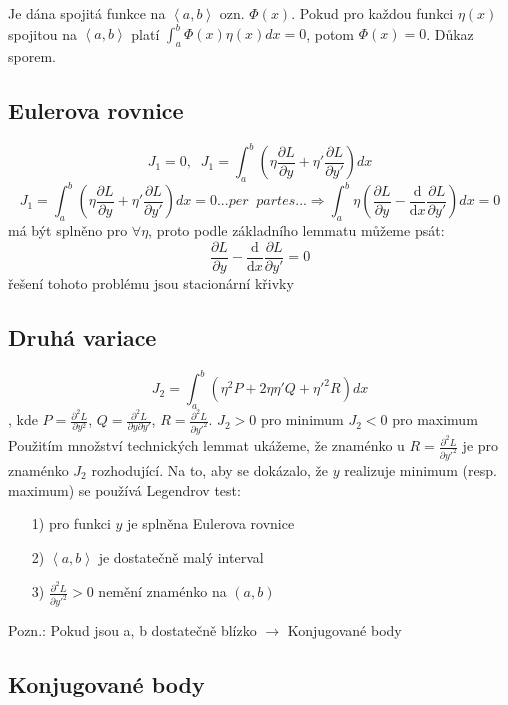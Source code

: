 {Je dána spojitá funkce na $\left \langle a,b \right \rangle$ ozn. $\Phi (x)$. Pokud pro každou funkci $\eta (x)$ spojitou na $\left \langle a,b \right \rangle$ platí $\int_{a}^{b}\Phi (x)\eta (x)dx=0$, potom $\Phi (x)=0$.
 Důkaz sporem.

\subsection{Eulerova rovnice}
$$J_{1}=0,\; \; J_{1}=\int_{a}^{b}(\eta\frac{\partial L}{\partial y} +{\eta }'\frac{\partial L}{\partial {y}'})dx$$
$$J_{1}=\int_{a}^{b}(\eta\frac{\partial L}{\partial y} +{\eta }'\frac{\partial L}{\partial {y}'})dx=0...per\; \; partes...\Rightarrow \int_{a}^{b}\eta (\frac{\partial L}{\partial y}-\frac{\mathrm{d} }{\mathrm{d} x}\frac{\partial L}{\partial {y}'})dx=0$$
má být splněno pro $\forall \eta $, proto podle základního lemmatu můžeme psát:
$$\frac{\partial L}{\partial y}-\frac{\mathrm{d} }{\mathrm{d} x}\frac{\partial L}{\partial {y}'}=0$$
řešení tohoto problému jsou stacionární křivky


\subsection{Druhá variace}

$$J_{2}=\int_{a}^{b}(\eta ^{2}P+2\eta {\eta }'Q+{\eta }'^{2}R)dx$$
, kde $P=\frac{\partial^2 L}{\partial y^2} $, $Q=\frac{\partial^2 L}{\partial y\partial {y}'} $, $R=\frac{\partial^2 L}{\partial {y}'^2} $. 
\newline $J_{2}> 0$ pro minimum 
\newline $J_{2}< 0$ pro maximum
\newline Použitím množství technických lemmat ukážeme, že znaménko u $R=\frac{\partial^2 L}{\partial {y}'^2} $ je pro znaménko $J_{2}$ rozhodující.
Na to, aby se dokázalo, že $y$ realizuje minimum (resp. maximum) se používá Legendrov test: 
  \begin{enumerate}
\item[1)] pro funkci $y$ je splněna Eulerova rovnice
\item[2)] $\left \langle a,b \right \rangle$ je dostatečně malý interval
\item[3)] $\frac{\partial^2 L}{\partial {y}'^2}>0$ nemění znaménko na $(a,b)$

\end{enumerate}
Pozn.: Pokud jsou a, b dostatečně blízko $\rightarrow$ Konjugované body

\subsection{Konjugované body}

}
